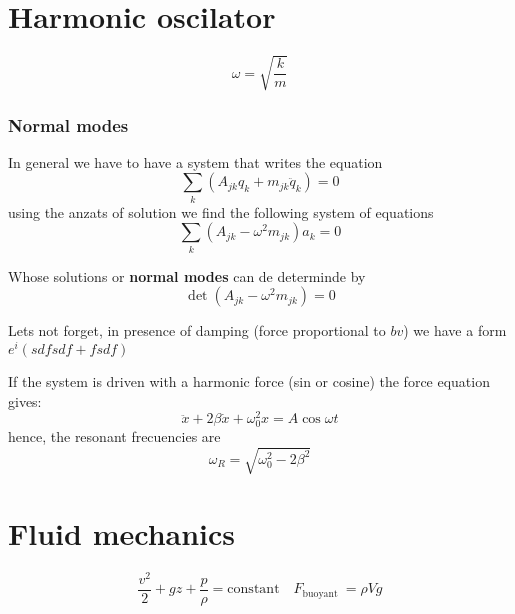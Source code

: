 \section{Harmonic oscilator}

$$\boxed{
   \omega=\sqrt{
      \frac{k}{m} 
   } 
}$$

\subsubsection{Normal modes}
In general we have to have a system that writes the equation $$\sum_{k}\left(A_{j k} q_{k}+m_{j k} \ddot{q}_{k}\right)=0$$ using the anzats of solution we find the following system of equations $$\sum_{k}\left(A_{j k}-\omega^{2} m_{j k}\right) a_{k}=0$$

Whose solutions or {\bf normal modes} can de determinde by $$\boxed{\operatorname{det}\left(A_{j k}-\omega^{2} m_{j k}\right)=0}$$

Lets not forget, in presence of damping (force proportional to $bv$) we have a form $e^i(sdfsdf+fsdf) $

If the system is driven with a harmonic force (sin or cosine) the force equation gives:
$$\ddot{x}+2 \beta \dot{x}+\omega_{0}^{2} x=A \cos \omega t$$ hence, the resonant frecuencies are $$\boxed{
    \omega_{R}=\sqrt{\omega_{0}^{2}-2 \beta^{2}}
}$$



\section{Fluid mechanics}

$$\boxed{
    \frac{v^{2}}{2}+g z+\frac{p}{\rho}=\mathrm{constant}
    
    \quad F_{
       \text{
          buoyant 
       } 
    }=\rho V g
}$$